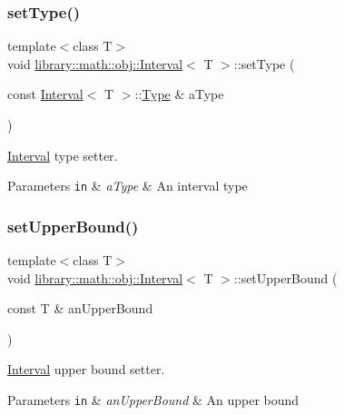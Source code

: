 \subsubsection{\texorpdfstring{set\+Type()}{setType()}}
{\footnotesize\ttfamily template$<$class T$>$ \\
void \hyperlink{classlibrary_1_1math_1_1obj_1_1_interval}{library\+::math\+::obj\+::\+Interval}$<$ T $>$\+::set\+Type (\begin{DoxyParamCaption}\item[{const \hyperlink{classlibrary_1_1math_1_1obj_1_1_interval}{Interval}$<$ T $>$\+::\hyperlink{classlibrary_1_1math_1_1obj_1_1_interval_abc7177f1c446d8273e70c989953667d1}{Type} \&}]{a\+Type }\end{DoxyParamCaption})}



\hyperlink{classlibrary_1_1math_1_1obj_1_1_interval}{Interval} type setter. 


\begin{DoxyParams}[1]{Parameters}
\mbox{\tt in}  & {\em a\+Type} & An interval type \\
\hline
\end{DoxyParams}
\mbox{\label{classlibrary_1_1math_1_1obj_1_1_interval_a9c6b857d9fad97969635f669428c2b48}} 
\subsubsection{\texorpdfstring{set\+Upper\+Bound()}{setUpperBound()}}
{\footnotesize\ttfamily template$<$class T$>$ \\
void \hyperlink{classlibrary_1_1math_1_1obj_1_1_interval}{library\+::math\+::obj\+::\+Interval}$<$ T $>$\+::set\+Upper\+Bound (\begin{DoxyParamCaption}\item[{const T \&}]{an\+Upper\+Bound }\end{DoxyParamCaption})}



\hyperlink{classlibrary_1_1math_1_1obj_1_1_interval}{Interval} upper bound setter. 


\begin{DoxyParams}[1]{Parameters}
\mbox{\tt in}  & {\em an\+Upper\+Bound} & An upper bound \\
\hline
\end{DoxyParams}
\mbox{\label{classlibrary_1_1math_1_1obj_1_1_interval_a64a1850152db9b95c9824c71378d9f40}} 
